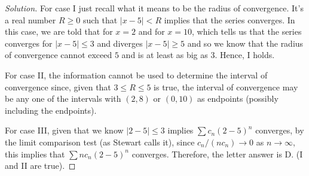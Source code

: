 \begin{proof}[Solution]
For case I just recall what it means to be the radius of
convergence. It's a real number $R\geq 0$ such that $|x-5|<R$ implies that
the series converges. In this case, we are told that for $x=2$ and for
$x=10$, which tells us that the series converges for $|x-5|\leq 3$ and
diverges $|x-5|\geq 5$ and so we know that the radius of convergence cannot
exceed $5$ and is at least as big as $3$. Hence, I holds.

For case II, the information cannot be used to determine the interval of
convergence since, given that $3\leq R\leq 5$ is true, the interval of
convergence may be any one of the intervals with $(2,8)$ or $(0,10)$ as
endpoints (possibly including the endpoints).

For case III, given that we know $|2-5|\leq 3$ implies $\sum c_n(2-5)^n$
converges, by the limit comparison test (as Stewart calls it), since
$c_n/(nc_n)\to 0$  as $n\to\infty$, this implies that $\sum nc_n(2-5)^n$
converges. Therefore, the letter answer is D. (I and II are true).
\end{proof}

\begin{center}
{\large{}}
\end{center}

